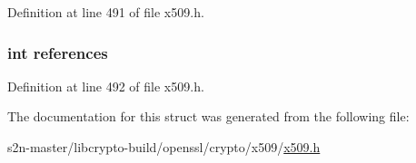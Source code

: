 Definition at line 491 of file x509.\+h.

\subsubsection[{\texorpdfstring{references}{references}}]{\setlength{\rightskip}{0pt plus 5cm}int references}\hypertarget{structprivate__key__st_a146fdb34d9a909e530adf8b189481195}{}\label{structprivate__key__st_a146fdb34d9a909e530adf8b189481195}


Definition at line 492 of file x509.\+h.



The documentation for this struct was generated from the following file\+:\begin{DoxyCompactItemize}
\item 
s2n-\/master/libcrypto-\/build/openssl/crypto/x509/\hyperlink{crypto_2x509_2x509_8h}{x509.\+h}\end{DoxyCompactItemize}
